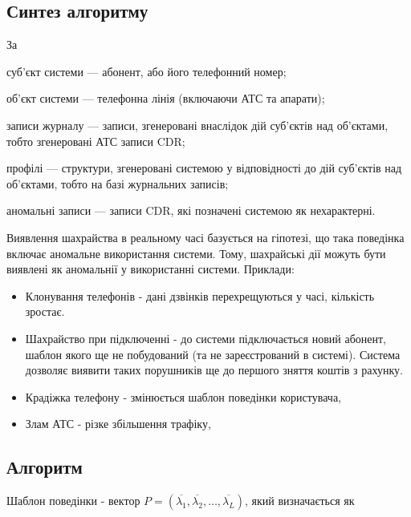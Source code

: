 \newpage
{}
\subsection{Синтез алгоритму}

За \cite{denning1987intrusion}  %

\begin{ESCDdescription}
\item суб'єкт системи --- абонент, або його телефонний номер;
\item об'єкт системи --- телефонна лінія (включаючи АТС та апарати);
\item записи журналу --- записи, згенеровані внаслідок дій суб'єктів над об'єктами, тобто згенеровані АТС записи CDR;
\item профілі --- структури, згенеровані системою у відповідності до дій суб'єктів над об'єктами, тобто на базі журнальних записів;
\item аномальні записи --- записи CDR, які позначені системою як нехарактерні.
\end{ESCDdescription}

Виявлення шахрайства в реальному часі базується на гіпотезі, що така поведінка включає аномальне використання системи. Тому, шахрайські дії можуть бути виявлені як аномальнії у використанні системи. Приклади: %

\begin{itemize}
  \item Клонування телефонів - дані дзвінків перехрещуються у часі, кількість зростає.
  \item Шахрайство при підключенні - до системи підключається новий абонент, шаблон якого ще не побудований (та не зареєстрований в системі). Система дозволяє виявити таких порушників ще до першого зняття коштів з рахунку.
  \item Крадіжка телефону - змінюється шаблон поведінки користувача,
  \item Злам АТС - різке збільшення трафіку,
\end{itemize}


    \subsection{Алгоритм}

  Шаблон поведінки - вектор $P = (\overline{\lambda_1}, \overline{\lambda_2}, \dots, \overline{\lambda_L})$, який визначається як 

